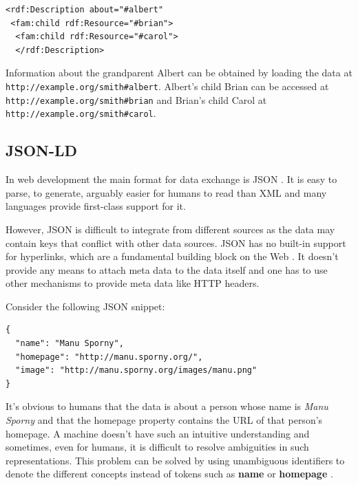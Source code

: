 \lstset{language=XML}
\begin{lstlisting}[caption= Simple example of a person as RDF, label=rdfexample]
<rdf:Description about="#albert"
 <fam:child rdf:Resource="#brian">
  <fam:child rdf:Resource="#carol">
  </rdf:Description>
\end{lstlisting}

Information about the grandparent Albert can be obtained by loading the data at \\ \lstinline{http://example.org/smith#albert}. Albert's child Brian can be accessed at \\  \lstinline{http://example.org/smith#brian} and Brian's child Carol at \lstinline{http://example.org/smith#carol}.

\subsection{JSON-LD}\label{jsonld}
In web development the main format for data exchange is JSON \citep{jsonformat}. It is easy to parse, to generate, arguably easier for humans to read than XML and many languages provide first-class support for it.

However, JSON is difficult to integrate from different sources as the data may contain keys that conflict with other data sources. JSON has no built-in support for hyperlinks, which are a fundamental building block on the Web \citep{jsonldbasicconcepts}. It doesn't provide any means to attach meta data to the data itself and one has to use other mechanisms to provide meta data like HTTP headers.

Consider the following JSON snippet:

\lstset{language=JSON}
\begin{lstlisting}[caption=Data of a person in the JSON format, label=jsonexample]
{
  "name": "Manu Sporny",
  "homepage": "http://manu.sporny.org/",
  "image": "http://manu.sporny.org/images/manu.png"
}
\end{lstlisting}

It's obvious to humans that the data is about a person whose name is \textit{Manu Sporny} and that the homepage property contains the URL of that person's homepage. A machine doesn't have such an intuitive understanding and sometimes, even for humans, it is difficult to resolve ambiguities in such representations. This problem can be solved by using unambiguous identifiers to denote the different concepts instead of tokens such as \textbf{name} or \textbf{homepage} \citep{jsonldbasicconcepts}.

